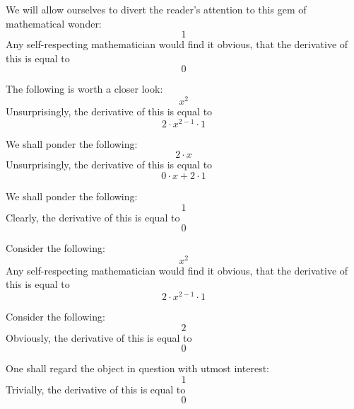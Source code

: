 \documentclass{article}
\begin{document}
We will allow ourselves to divert the reader's attention to this gem of mathematical wonder:
\begin{equation}
1 
\end{equation}
Any self-respecting mathematician would find it obvious, that the derivative of this is equal to
\begin{equation}
0 
\end{equation}

The following is worth a closer look:
\begin{equation}
x ^{2 } 
\end{equation}
Unsurprisingly, the derivative of this is equal to
\begin{equation}
2 \cdot x ^{2 - 1 } \cdot 1 
\end{equation}

We shall ponder the following:
\begin{equation}
2 \cdot x 
\end{equation}
Unsurprisingly, the derivative of this is equal to
\begin{equation}
0 \cdot x + 2 \cdot 1 
\end{equation}

We shall ponder the following:
\begin{equation}
1 
\end{equation}
Clearly, the derivative of this is equal to
\begin{equation}
0 
\end{equation}

Consider the following:
\begin{equation}
x ^{2 } 
\end{equation}
Any self-respecting mathematician would find it obvious, that the derivative of this is equal to
\begin{equation}
2 \cdot x ^{2 - 1 } \cdot 1 
\end{equation}

Consider the following:
\begin{equation}
2 
\end{equation}
Obviously, the derivative of this is equal to
\begin{equation}
0 
\end{equation}

One shall regard the object in question with utmost interest:
\begin{equation}
1 
\end{equation}
Trivially, the derivative of this is equal to
\begin{equation}
0 
\end{equation}
\end{document}

